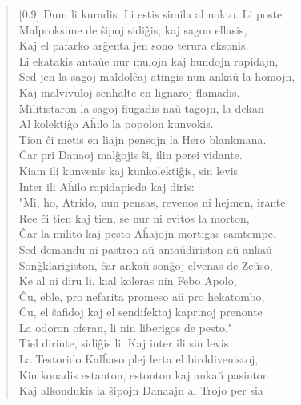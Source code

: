 \begin{verse}[0.9\textwidth]
          Dum li kuradis. Li estis simila al nokto. Li poste\\
          Malproksime de \^sipoj sidi\^gis, kaj sagon ellasis,\\
          Kaj el pafarko ar\^genta jen sono terura eksonis.\\
          Li ekatakis anta\u ue nur mulojn kaj hundojn rapidajn,\\
          Sed jen la sagoj maldol\^caj atingis nun anka\u u la homojn,\\
          Kaj malvivuloj senhalte en lignaroj flamadis.\\
          Militistaron la sagoj flugadis na\u u tagojn, la dekan\\
          Al kolekti\^go A\^hilo la popolon kunvokis.\\
          Tion \^ci metis en liajn pensojn la Hero blankmana.\\
          \^Car pri Danaoj mal\^gojis \^si, ilin perei vidante.\\
          Kiam ili kunvenis kaj kunkolekti\^gis, sin levis\\
          Inter ili A\^hilo rapidapieda kaj diris:\\
           \vin  "Mi, ho, Atrido, nun pensas, revenos ni hejmen, irante\\
          Ree \^ci tien kaj tien, se nur ni evitos la morton,\\
          \^Car la milito kaj pesto A\^hajojn mortigas samtempe.\\
          Sed demandu ni pastron a\u u anta\u udiriston a\u u anka\u u\\
          Son\^gklarigiston, \^car anka\u u son\^goj elvenas de Ze\u uso,\\
          Ke al ni diru li, kial koleras nin Febo Apolo,\\
          \^Cu, eble, pro nefarita promeso a\u u pro hekatombo,\\
          \^Cu, el \^safidoj kaj el sendifektaj kaprinoj prenonte\\
          La odoron oferan, li nin liberigos de pesto."\\
           \vin  Tiel dirinte, sidi\^gis li. Kaj inter ili sin levis\\
          La Testorido Kal\^haso plej lerta el birddivenistoj,\\
          Kiu konadis estanton, estonton kaj anka\u u pasinton\\
          Kaj alkondukis la \^sipojn Danaajn al Trojo per sia\\

\end{verse}

